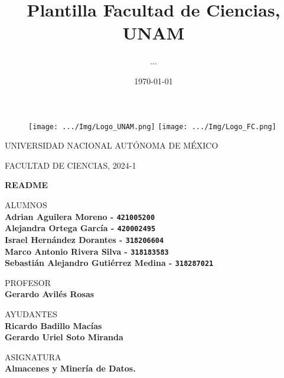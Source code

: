 \documentclass{article}
\title{Plantilla Facultad de Ciencias, UNAM}
\author{...}
\date{\today}
\begin{document}
\thispagestyle{empty}
	
	\begin{figure}[ht]
			\texttt{[image: .../Img/Logo\_UNAM.png]}
			\label{EscudoUNAM}
	   \endminipage
			\texttt{[image: .../Img/Logo\_FC.png]}
			\label{EscudoFC}
		\endminipage
	\end{figure}
	
	\begin{center}
	\vspace{0.8cm}
	\LARGE
	UNIVERSIDAD NACIONAL AUTÓNOMA DE MÉXICO 
	
	\vspace{0.7cm}
	\LARGE
	FACULTAD DE CIENCIAS, 2024-1
	
	\vspace{0.8 cm}	
	\Huge
	\textbf{README}

	\vspace{0.8 cm}
	\normalsize	
	ALUMNOS \\
	\vspace{.2cm}
	\large
	\textbf{Adrian Aguilera Moreno - \texttt{421005200}}\\
 	\textbf{Alejandra Ortega García - \texttt{420002495}}\\
	\textbf{Israel Hernández Dorantes - \texttt{318206604}}\\
    \textbf{Marco Antonio Rivera Silva - \texttt{318183583}}\\
	\textbf{Sebastián Alejandro Gutiérrez Medina - \texttt{318287021}}
	
	\vspace{1 cm}
	\normalsize	
	PROFESOR \\
	\vspace{.2cm}
	\large
	\textbf{Gerardo Avilés Rosas}
	
	\vspace{1 cm}
	AYUDANTES \\
	\vspace{.2cm}
	\large
 	\textbf{Ricardo Badillo Macías}\\
	\textbf{Gerardo Uriel Soto Miranda}\\
	\vspace{1.3cm}
	
	\normalsize	
	ASIGNATURA \\
	\vspace{.2cm}
	\Large
	\textbf{Almacenes y Minería de Datos.}
	
	\vspace{1 cm}
	\end{center}
\end{document}
